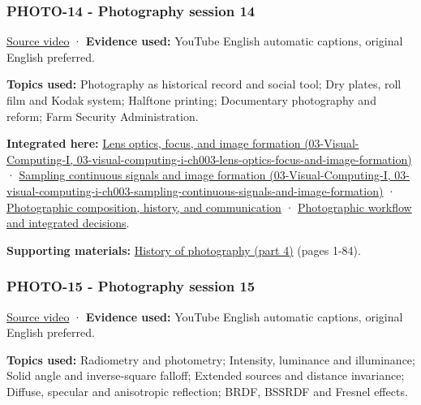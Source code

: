 \subsubsection{PHOTO-14 - Photography session 14}\label{04-visual-computing-ii-ch036-photo-14---photography-session-14}

\href{https://www.youtube.com/watch?v=p964fzQC11g}{Source video} · \textbf{Evidence used:} YouTube English automatic captions, original English preferred.

\textbf{Topics used:} Photography as historical record and social tool; Dry plates, roll film and Kodak system; Halftone printing; Documentary photography and reform; Farm Security Administration.

\textbf{Integrated here:} \href{../03-Visual-Computing-I/main.pdf\#nameddest=03-visual-computing-i-ch003-lens-optics-focus-and-image-formation}{Lens optics, focus, and image formation (03-Visual-Computing-I, 03-visual-computing-i-ch003-lens-optics-focus-and-image-formation)} · \href{../03-Visual-Computing-I/main.pdf\#nameddest=03-visual-computing-i-ch003-sampling-continuous-signals-and-image-formation}{Sampling continuous signals and image formation (03-Visual-Computing-I, 03-visual-computing-i-ch003-sampling-continuous-signals-and-image-formation)} · \hyperref[04-visual-computing-ii-ch034-photographic-composition-history-and-communication]{Photographic composition, history, and communication} · \hyperref[04-visual-computing-ii-ch034-photographic-workflow-and-integrated-decisions]{Photographic workflow and integrated decisions}.

\textbf{Supporting materials:} \href{https://drive.google.com/open?id=0B6w2XfPHEcZYTjRoLWhnSUFEYTQ}{History of photography (part 4)} (pages 1-84).

\subsubsection{PHOTO-15 - Photography session 15}\label{04-visual-computing-ii-ch036-photo-15---photography-session-15}

\href{https://www.youtube.com/watch?v=kO68jM_1eho}{Source video} · \textbf{Evidence used:} YouTube English automatic captions, original English preferred.

\textbf{Topics used:} Radiometry and photometry; Intensity, luminance and illuminance; Solid angle and inverse-square falloff; Extended sources and distance invariance; Diffuse, specular and anisotropic reflection; BRDF, BSSRDF and Fresnel effects.

